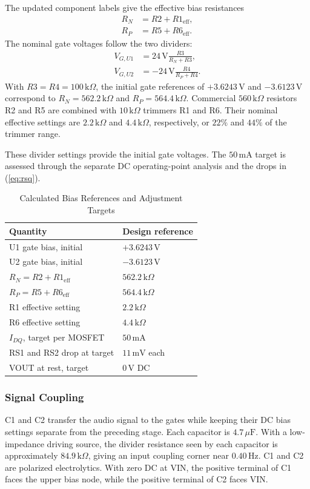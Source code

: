\documentclass[conference,letterpaper]{IEEEtran}
\newcommand{\kohm}{\mathrm{k}\Omega}
\newcommand{\uF}{\mu\mathrm{F}}
\newcommand{\V}{\mathrm{V}}
\newcommand{\Hz}{\mathrm{Hz}}
\begin{document}
The updated component labels give the effective bias resistances
\begin{align}
R_N&=R2+R1_{\mathrm{eff}},\\
R_P&=R5+R6_{\mathrm{eff}}.
\end{align}
The nominal gate voltages follow the two dividers:
\begin{align}
V_{G,U1}&=24\,\V\frac{R3}{R_N+R3},\\
V_{G,U2}&=-24\,\V\frac{R4}{R_P+R4}.
\end{align}
With $R3=R4=100\,\kohm$, the initial gate references of
$+3.6243\,\V$ and $-3.6123\,\V$ correspond to
$R_N=562.2\,\kohm$ and $R_P=564.4\,\kohm$. Commercial
$560\,\kohm$ resistors R2 and R5 are combined with $10\,\kohm$
trimmers R1 and R6. Their nominal effective settings are
$2.2\,\kohm$ and $4.4\,\kohm$, respectively, or $22\%$ and
$44\%$ of the trimmer range.

These divider settings provide the initial gate voltages. The
$50\,\mathrm{mA}$ target is assessed through the separate DC
operating-point analysis and the drops in (\ref{eq:rsq}).

\begin{table}[H]
\caption{Calculated Bias References and Adjustment Targets}
\label{tab:biascalc}
\centering\footnotesize
\begin{tabular}{@{}p{}p{}@{}}
\toprule
Quantity & Design reference\\
\midrule
U1 gate bias, initial & $+3.6243\,\V$\\
U2 gate bias, initial & $-3.6123\,\V$\\
$R_N=R2+R1_{\mathrm{eff}}$ & $562.2\,\kohm$\\
$R_P=R5+R6_{\mathrm{eff}}$ & $564.4\,\kohm$\\
R1 effective setting & $2.2\,\kohm$\\
R6 effective setting & $4.4\,\kohm$\\
$I_{DQ}$, target per MOSFET & $50\,\mathrm{mA}$\\
RS1 and RS2 drop at target & $11\,\mathrm{mV}$ each\\
VOUT at rest, target & $0\,\V$ DC\\
\bottomrule
\end{tabular}
\end{table}

\subsubsection{Signal Coupling}
C1 and C2 transfer the audio signal to the gates while keeping their
DC bias settings separate from the preceding stage. Each capacitor
is $4.7\,\uF$. With a low-impedance driving source, the divider
resistance seen by each capacitor is approximately $84.9\,\kohm$,
giving an input coupling corner near $0.40\,\Hz$.
C1 and C2 are polarized electrolytics. With zero DC at VIN, the positive
terminal of C1 faces the upper bias node, while the positive terminal
of C2 faces VIN.
\end{document}
